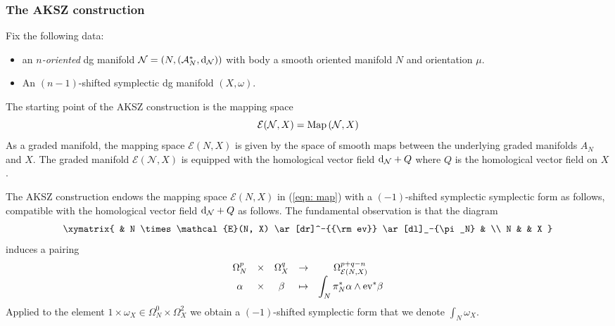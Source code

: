 \documentclass{article}
\newcommand{\cE}{\mathcal{E}}
\newcommand{\cN}{\mathcal{N}}
\def\sA{\mathcal{A}}
\def\d{{\rm d}}
\theoremstyle{definition}
\theoremstyle{remark}
\def\brian{\textcolor{blue}{BM: }\textcolor{blue}}
\begin{document}
%

\subsubsection{The AKSZ construction}

Fix the following data:
\begin{itemize}
\item an {\em $n$-oriented} dg manifold $\cN = (N, (\sA^*_N, \d_\cN))$ with body a smooth oriented manifold $N$ and orientation $\mu$. 
\item An $(n-1)$-shifted symplectic dg manifold $(X,\omega)$. 
\end{itemize}

The starting point of the AKSZ construction is the mapping space
\begin{equation}\label{eqn: map}
\cE (\cN, X) = {\rm Map}\left(\cN, X\right)
\end{equation}
As a graded manifold, the mapping space $\cE(N,X)$ is given by the space of smooth maps between the underlying graded manifolds $A_N$ and $X$. 
The graded manifold $\cE(\cN, X)$ is equipped with the homological vector field $\d_\cN + Q$ where $Q$ is the homological vector field on $X$. 

The AKSZ construction endows the mapping space $\cE(N, X)$ in (\ref{eqn: map}) with a $(-1)$-shifted symplectic symplectic form as follows, compatible with the homological vector field $\d_{\cN} + Q$ as follows.
The fundamental observation is that the diagram
\[
\xymatrix{
& N \times \cE(N, X) \ar[dr]^-{{\rm ev}} \ar[dl]_-{\pi_N} & \\
N & & X
}
\]
induces a pairing
\[
\begin{array}{ccccc}
 \Omega^p_N& \times & \Omega^q_X & \to & \Omega^{p+q-n}_{\cE(N, X)} \\
\displaystyle \alpha & \times & \beta & \mapsto & \displaystyle \int_N \pi_N^* \alpha \wedge {\rm ev}^* \beta 
 \end{array}
 \]
Applied to the element $1 \times \omega_X \in \Omega^0_N \times \Omega^{2}_X$ we obtain a $(-1)$-shifted symplectic form that we denote $\int_N \omega_X$.
\end{document}
